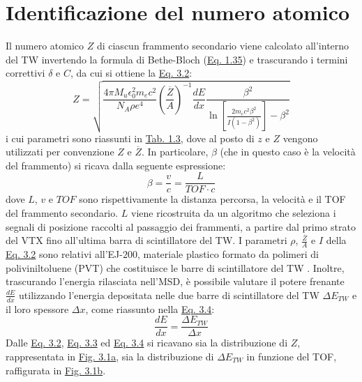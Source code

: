 \documentclass[12pt,a4paper,twoside]{report}
\begin{document}
	\section{Identificazione del numero atomico}\label{sec:atomic_number_identification}
	Il numero atomico $Z$ di ciascun frammento secondario viene calcolato all'interno del TW invertendo la formula di Bethe-Bloch (\hyperref[eq:bethe_bloch]{Eq. 1.35}) e trascurando i termini correttivi $\delta$ e $C$, da cui si ottiene la \hyperref[eq:atomic_number]{Eq. 3.2}:
	\begin{equation}
		Z=\sqrt{\frac{4\pi M_u\epsilon_0^2m_ec^2}{N_A\rho e^4}\left(\frac{\overline{Z}}{A}\right)^{-1}\frac{dE}{dx}\frac{\beta^2}{\ln{\left[\frac{2m_ec^2\beta^2}{I\left(1-\beta^2\right)}\right]}-\beta^2}}
		\label{eq:atomic_number}
	\end{equation}
	i cui parametri sono riassunti in \hyperref[tab:bethe_bloch]{Tab. 1.3}, dove al posto di $z$ e $Z$ vengono utilizzati per convenzione $Z$ e $\overline{Z}$. In particolare, $\beta$ (che in questo caso è la velocità del frammento) si ricava dalla seguente espressione:
	\begin{equation}
		\beta=\frac{v}{c}=\frac{L}{TOF\cdot c}
		\label{eq:beta_beam}
	\end{equation}
	dove $L$, $v$ e $TOF$ sono rispettivamente la distanza percorsa, la velocità e il TOF del frammento secondario. $L$ viene ricostruita da un algoritmo che seleziona i segnali di posizione raccolti al passaggio dei frammenti, a partire dal primo strato del VTX fino all'ultima barra di scintillatore del TW. I parametri $\rho$, $\frac{\overline{Z}}{A}$ e $I$ della \hyperref[eq:atomic_number]{Eq. 3.2} sono relativi all'EJ-$200$, materiale plastico formato da polimeri di poliviniltoluene (PVT) che costituisce le barre di scintillatore del TW \cite{pvt}. Inoltre, trascurando l'energia rilasciata nell'MSD, è possibile valutare il potere frenante $\frac{dE}{dx}$ utilizzando l'energia depositata nelle due barre di scintillatore del TW $\Delta E_{TW}$ e il loro spessore $\Delta x$, come riassunto nella \hyperref[eq:stopping_power]{Eq. 3.4}:
	\begin{equation}
		\frac{dE}{dx}=\frac{\Delta E_{TW}}{\Delta x}
		\label{eq:stopping_power}
	\end{equation}
	Dalle \hyperref[eq:atomic_number]{Eq. 3.2}, \hyperref[eq:beta_beam]{Eq. 3.3} ed \hyperref[eq:stopping_power]{Eq. 3.4} si ricavano sia la distribuzione di $Z$, rappresentata in \hyperref[fig:atomic_numbersa]{Fig. 3.1a}, sia la distribuzione di $\Delta E_{TW}$ in funzione del TOF, raffigurata in \hyperref[fig:atomic_numbersb]{Fig. 3.1b}.
	
\end{document}
